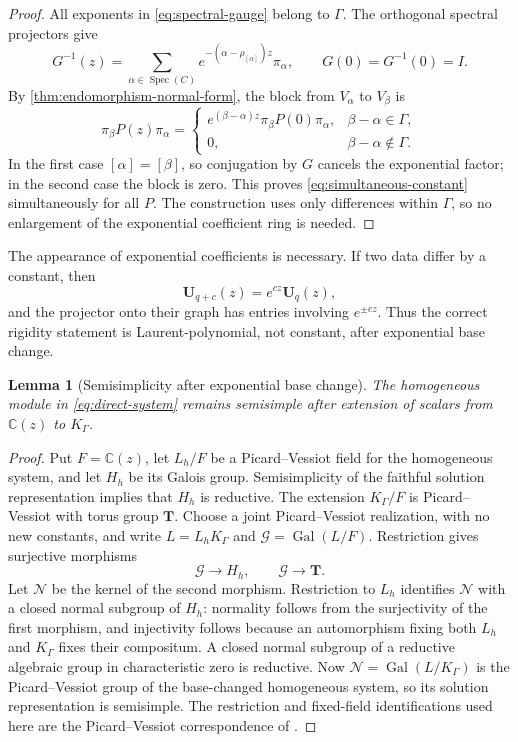 \documentclass[11pt]{article}
\numberwithin{equation}{section}
\newtheorem{lemma}[lemma]{Lemma}
\theoremstyle{definition}
\theoremstyle{remark}
\newcommand{\C}{\mathbb C}
\newcommand{\Spec}{\operatorname{Spec}}
\begin{document}
\begin{proof}
All exponents in \eqref{eq:spectral-gauge} belong to $\Gamma$.  The
orthogonal spectral projectors give
\[
  G^{-1}(z)=\sum_{\alpha\in\Spec(C)}
           e^{-(\alpha-\rho_{[\alpha]})z}\pi_\alpha,
  \qquad G(0)=G^{-1}(0)=I.
\]
By \cref{thm:endomorphism-normal-form}, the block from $V_\alpha$ to
$V_\beta$ is
\[
  \pi_\beta P(z)\pi_\alpha
  =\begin{cases}
     e^{(\beta-\alpha)z}\pi_\beta P(0)\pi_\alpha,
       &\beta-\alpha\in\Gamma,\\
     0,&\beta-\alpha\notin\Gamma.
   \end{cases}
\]
In the first case $[\alpha]=[\beta]$, so conjugation by $G$ cancels the
exponential factor; in the second case the block is zero.  This proves
\eqref{eq:simultaneous-constant} simultaneously for all $P$.  The
construction uses only differences within $\Gamma$, so no enlargement of
the exponential coefficient ring is needed.
\end{proof}

The appearance of exponential coefficients is necessary.  If two data differ
by a constant, then
\[
  \mathbf U_{q+c}(z)=e^{cz}\mathbf U_q(z),
\]
and the projector onto their graph has entries involving $e^{\pm cz}$.
Thus the correct rigidity statement is Laurent-polynomial, not constant,
after exponential base change.

\begin{lemma}[Semisimplicity after exponential base change]
\label{lem:base-change-semisimple}
The homogeneous module in \eqref{eq:direct-system} remains semisimple after
extension of scalars from $\C(z)$ to $K_\Gamma$.
\end{lemma}

\begin{proof}
Put $F=\C(z)$, let $L_h/F$ be a Picard--Vessiot field for the
homogeneous system, and let $H_h$ be its Galois group.  Semisimplicity of
the faithful solution representation implies that $H_h$ is reductive.
The extension $K_\Gamma/F$ is Picard--Vessiot with torus group $\mathbf T$.
Choose a joint Picard--Vessiot realization, with no new constants, and
write $L=L_hK_\Gamma$ and $\mathcal G=\operatorname{Gal}(L/F)$.
Restriction gives surjective morphisms
\[
  \mathcal G\longrightarrow H_h,
  \qquad \mathcal G\longrightarrow\mathbf T.
\]
Let $\mathcal N$ be the kernel of the second morphism.  Restriction to
$L_h$ identifies $\mathcal N$ with a closed normal subgroup of $H_h$:
normality follows from the surjectivity of the first morphism, and
injectivity follows because an automorphism fixing both $L_h$ and
$K_\Gamma$ fixes their compositum.  A closed normal subgroup of a
reductive algebraic group in characteristic zero is reductive.
Now $\mathcal N=\operatorname{Gal}(L/K_\Gamma)$ is the
Picard--Vessiot group of the base-changed homogeneous system, so its
solution representation is semisimple.  The restriction and fixed-field
identifications used here are the Picard--Vessiot correspondence of
\cite[Chapter~1]{vanDerPutSinger}.
\end{proof}
\end{document}
